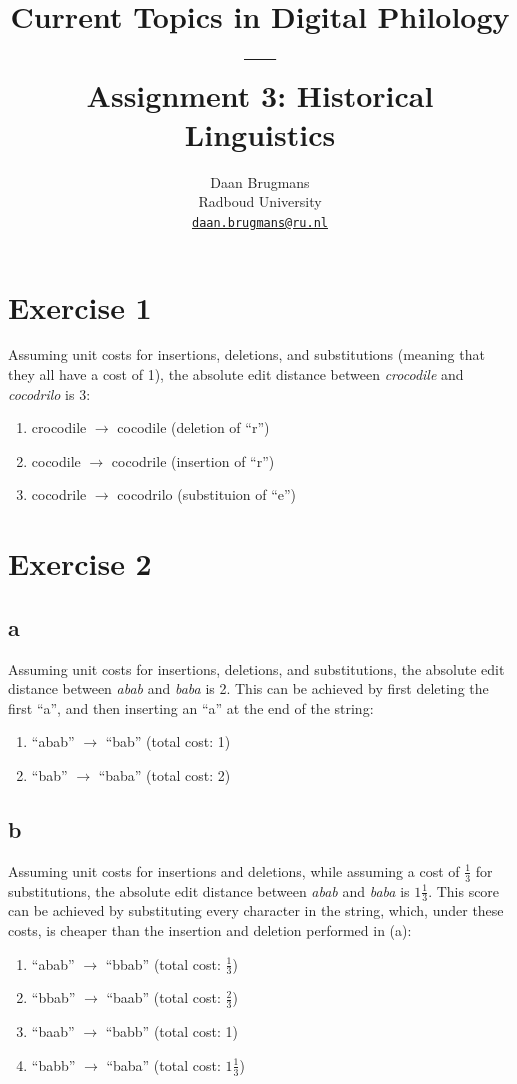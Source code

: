 \documentclass{article}
\title{Current Topics in Digital Philology --- \\Assignment 3: Historical Linguistics}
\author{%
  Daan Brugmans \\
  Radboud University\\
  \texttt{\url{daan.brugmans@ru.nl}} \\
}
\begin{document}


\maketitle

\section{Exercise 1}
Assuming unit costs for insertions, deletions, and substitutions (meaning that they all have a cost of 1), the absolute edit distance between \textit{crocodile} and \textit{cocodrilo} is 3:
\begin{enumerate}
    \item crocodile $\rightarrow$ cocodile (deletion of ``r'')
    \item cocodile $\rightarrow$ cocodrile (insertion of ``r'')
    \item cocodrile $\rightarrow$ cocodrilo (substituion of ``e'')
\end{enumerate}

\section{Exercise 2}
\subsection{a}
Assuming unit costs for insertions, deletions, and substitutions, the absolute edit distance between \textit{abab} and \textit{baba} is 2. This can be achieved by first deleting the first ``a'', and then inserting an ``a'' at the end of the string:
\begin{enumerate}
    \item ``abab'' $\rightarrow$ ``bab'' (total cost: 1)
    \item ``bab'' $\rightarrow$ ``baba'' (total cost: 2)
\end{enumerate}

\subsection{b}
Assuming unit costs for insertions and deletions, while assuming a cost of $\frac{1}{3}$ for substitutions, the absolute edit distance between \textit{abab} and \textit{baba} is $1\frac{1}{3}$. This score can be achieved by substituting every character in the string, which, under these costs, is cheaper than the insertion and deletion performed in (a):
\begin{enumerate}
    \item ``abab'' $\rightarrow$ ``bbab'' (total cost: $\frac{1}{3}$)
    \item ``bbab'' $\rightarrow$ ``baab'' (total cost: $\frac{2}{3}$)
    \item ``baab'' $\rightarrow$ ``babb'' (total cost: 1)
    \item ``babb'' $\rightarrow$ ``baba'' (total cost: $1\frac{1}{3}$)
\end{enumerate}
\end{document}
